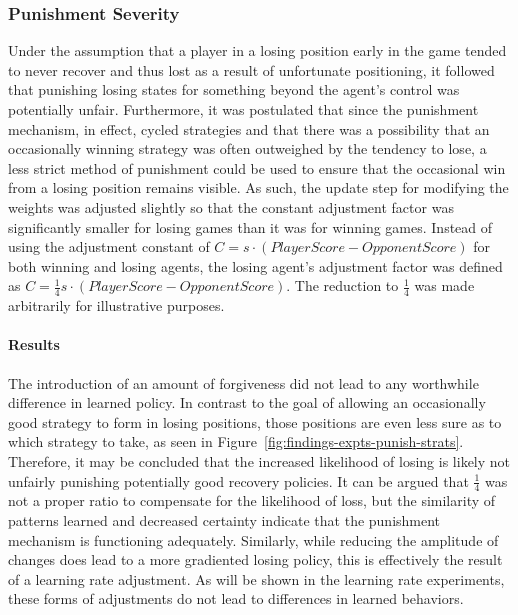 
\subsubsection*{Punishment Severity}
\label{sec:findings-expts-punishments}

Under the assumption that a player in a losing position
early in the game tended to never recover and thus lost as a result of
unfortunate positioning,
it followed that punishing losing states for something beyond the agent's
control was potentially unfair.
%
Furthermore,
it was postulated that since the punishment mechanism, in effect, cycled
strategies
and that there was a possibility that an occasionally winning strategy was often
outweighed by the tendency to lose,
a less strict method of punishment could be used to ensure that the occasional
win from a losing position remains visible.
%
As such,
the update step for modifying the weights was adjusted slightly
so that the constant adjustment factor was significantly smaller for losing
games than it was for winning games.
%
Instead of using the adjustment constant of
$C = s \cdot (\textit{PlayerScore} - \textit{OpponentScore})$
for both winning and losing agents,
the losing agent's adjustment factor was defined as
$C = \frac{1}{4} s \cdot (\textit{PlayerScore} - \textit{OpponentScore})$.
%
The reduction to $\frac{1}{4}$ was made arbitrarily for illustrative purposes.

\paragraph*{Results}

The introduction of an amount of forgiveness did not lead to any worthwhile
difference in learned policy.
%
In contrast to the goal of allowing an occasionally good strategy to form
in losing positions,
those positions are even less sure as to which strategy to take,
as seen in Figure~\ref{fig:findings-expts-punish-strats}.
%
Therefore,
it may be concluded that the increased likelihood of losing is 
likely not unfairly punishing potentially good recovery policies.
%
It can be argued that $\frac{1}{4}$ was not a proper ratio
to compensate for the likelihood of loss,
but the similarity of patterns learned and decreased certainty
indicate that the punishment mechanism is functioning adequately.
%
Similarly,
while reducing the amplitude of changes
does lead to a more gradiented losing policy,
this is effectively the result of a learning rate adjustment.
%
As will be shown in the learning rate experiments,
these forms of adjustments do not lead to differences in learned behaviors.



